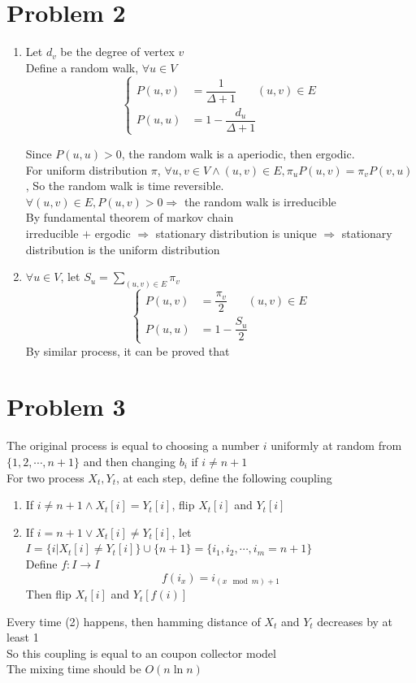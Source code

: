 \documentclass[12pt]{article}
\begin{document}
\section*{Problem 2}
\begin{enumerate}
\item
Let $d_v$ be the degree of vertex $v$\\
Define a random walk, $\forall u\in V$\\
$$
\left\{
\begin{aligned}
P(u,v)&=\dfrac{1}{\Delta+1}~~~~~~~~(u,v)\in E\\
P(u,u)&=1-\dfrac{d_u}{\Delta+1}
\end{aligned}
\right.
$$

Since $P(u,u)>0$, the random walk is a aperiodic, then ergodic.\\

For uniform distribution $\pi$, $\forall u,v\in V \wedge (u,v)\in E, \pi_uP(u, v)=\pi_vP(v, u)$, So the random walk is time reversible.\\

$\forall (u,v)\in E, P(u,v)>0 \Rightarrow$ the random walk is irreducible\\
By fundamental theorem of markov chain\\
 irreducible $+$ ergodic $\Rightarrow$ stationary distribution is unique $\Rightarrow$ stationary distribution is the uniform distribution
\item
$\forall u\in V$, let $S_u=\sum_{(u,v)\in E}\pi_v$\\
$$
\left\{
\begin{aligned}
P(u,v)&=\dfrac{\pi_v}{2}~~~~~~~~(u,v)\in E\\
P(u,u)&=1-\dfrac{S_u}{2}
\end{aligned}
\right.
$$
By similar process, it can be proved that 
\end{enumerate}

\section*{Problem 3}
The original process is equal to choosing a number $i$ uniformly at random from $\{1,2,\cdots,n+1\}$ and then changing $b_i$ if $i\neq n+1$\\
For two process $X_t, Y_t$, at each step, define the following coupling\\
\begin{enumerate}
\item
If $i\neq n+1\wedge X_t[i]=Y_t[i]$, flip $X_t[i]$ and $Y_t[i]$
\item
If $i=n+1 \vee X_t[i]\neq Y_t[i]$, let $I=\{i|X_t[i]\neq Y_t[i]\}\cup\{n+1\}=\{i_1,i_2,\cdots,i_{m}=n+1\}$\\
Define $f:I\rightarrow I$
$$f(i_x)=i_{(x\mod m)+1}$$
Then flip $X_t[i]$ and $Y_t[f(i)]$\\
\end{enumerate}
Every time (2) happens, then hamming distance of $X_t$ and $Y_t$ decreases by at least 1\\
So this coupling is equal to an coupon collector model\\
The mixing time should be $O(n\ln n)$
\end{document}
